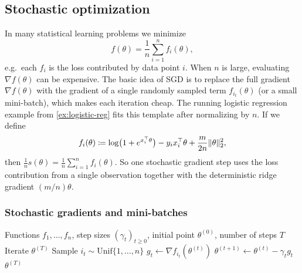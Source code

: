 \subsection{Stochastic optimization}
\label{subsec:sgd}

In many statistical learning problems we minimize
\begin{equation}
  f(\theta) = \frac{1}{n}\sum_{i=1}^n f_i(\theta),
  \label{eq:finite-sum}
\end{equation}
e.g.\ each $f_i$ is the loss contributed by data point $i$.
When $n$ is large, evaluating $\nabla f(\theta)$ can be expensive.
The basic idea of SGD is to replace the full gradient $\nabla f(\theta)$ with the gradient of a single randomly sampled term $f_{i_t}(\theta)$ (or a small mini-batch), which makes each iteration cheap.
The running logistic regression example from \cref{ex:logistic-reg} fits this template after normalizing by $n$.
If we define
\[
  f_i(\theta)
  \coloneqq
  \log\bigl(1+e^{x_i^\top\theta}\bigr) - y_i x_i^\top\theta + \frac{m}{2n}\lVert\theta\rVert_2^2,
\]
then $\frac{1}{n}s(\theta)=\frac{1}{n}\sum_{i=1}^n f_i(\theta)$.
So one stochastic gradient step uses the loss contribution from a single observation together with the deterministic ridge gradient $(m/n)\theta$.

\subsubsection{Stochastic gradients and mini-batches}

\begin{algorithm}
  \caption{Stochastic gradient descent (SGD)}
  \label{alg:sgd}
  \begin{algorithmic}[1]
    \Require Functions $f_1,\dots,f_n$, step sizes $(\gamma_t)_{t\ge 0}$, initial point $\theta^{(0)}$, number of steps $T$
    \Ensure Iterate $\theta^{(T)}$
      \State Sample $i_t \sim \mathrm{Unif}\{1,\dots,n\}$
      \State $g_t \gets \nabla f_{i_t}(\theta^{(t)})$
      \State $\theta^{(t+1)} \gets \theta^{(t)} - \gamma_t g_t$
    \EndFor
    \State \Return $\theta^{(T)}$
  \end{algorithmic}
\end{algorithm}

